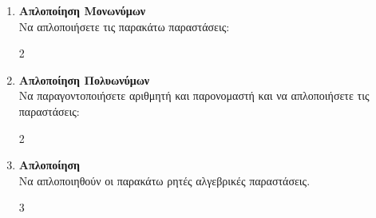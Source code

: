 \documentclass[11pt,a4paper,modern]{FFExercises}
\begin{document}
\begin{enumerate}[resume]
\begin{center}
\textbf{ΑΠΛΟΠΟΙΗΣΗ}
\end{center}

\item \textbf{Απλοποίηση Μονωνύμων}\\
Να απλοποιήσετε τις παρακάτω παραστάσεις:
\begin{multicols}{2}
\end{multicols}

\item \textbf{Απλοποίηση Πολυωνύμων}\\
Να παραγοντοποιήσετε αριθμητή και παρονομαστή και να απλοποιήσετε τις παραστάσεις:
\begin{multicols}{2}
\end{multicols}

\item \textbf{Απλοποίηση}\\
Να απλοποιηθούν οι παρακάτω ρητές αλγεβρικές παραστάσεις.
\begin{multicols}{3}
\end{multicols}


\end{enumerate}
\end{document}
